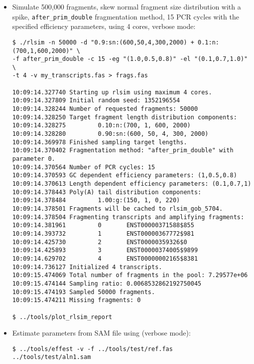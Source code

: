 \begin{itemize}
{}

\item{Simulate 500,000 fragments, skew normal fragment size distribution with a spike, {\tt after\_prim\_double} fragmentation method, 15 PCR cycles with the specified efficiency parameters, using 4 cores, verbose mode:

\begin{verbatim}
$ ./rlsim -n 50000 -d "0.9:sn:(600,50,4,300,2000) + 0.1:n:(700,1,600,2000)" \
-f after_prim_double -c 15 -eg "(1.0,0.5,0.8)" -el "(0.1,0.7,1.0)" \
-t 4 -v my_transcripts.fas > frags.fas

10:09:14.327740 Starting up rlsim using maximum 4 cores.
10:09:14.327809 Initial random seed: 1352196554
10:09:14.328244 Number of requested fragments: 50000
10:09:14.328250 Target fragment length distribution components:
10:09:14.328275         0.10:n:(700, 1, 600, 2000)
10:09:14.328280         0.90:sn:(600, 50, 4, 300, 2000)
10:09:14.369978 Finished sampling target lengths.
10:09:14.370402 Fragmentation method: "after_prim_double" with parameter 0.
10:09:14.370564 Number of PCR cycles: 15
10:09:14.370593 GC dependent efficiency parameters: (1,0.5,0.8)
10:09:14.370613 Length dependent efficiency parameters: (0.1,0.7,1)
10:09:14.378443 Poly(A) tail distribution components:
10:09:14.378484         1.00:g:(150, 1, 0, 220)
10:09:14.378501 Fragments will be cached to rlsim_gob_5704.
10:09:14.378504 Fragmenting transcripts and amplifying fragments:
10:09:14.381961         0       ENST00000371588$855
10:09:14.393732         1       ENST00000367772$981
10:09:14.425730         2       ENST00000359326$0
10:09:14.425893         3       ENST00000374005$9899
10:09:14.629702         4       ENST00000002165$8381
10:09:14.736127 Initialized 4 transcripts.
10:09:15.474069 Total number of fragments in the pool: 7.29577e+06
10:09:15.474144 Sampling ratio: 0.0068532862192750045
10:09:15.474193 Sampled 50000 fragments.
10:09:15.474211 Missing fragments: 0

$ ../tools/plot_rlsim_report
\end{verbatim}

}
\item{Estimate parameters from SAM file  using \effest (verbose mode):

\begin{verbatim}
$ ../tools/effest -v -f ../tools/test/ref.fas ../tools/test/aln1.sam 


\end{verbatim}}
\end{itemize}
